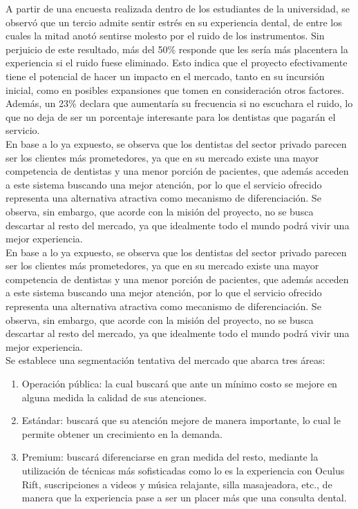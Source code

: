 \documentclass[letterpaper,12pt]{article}
\begin{document}
\indent A partir de una encuesta realizada dentro de los estudiantes de la universidad, se observó 
que un tercio admite sentir estrés en su experiencia dental, de entre los cuales la mitad anotó 
sentirse molesto por el ruido de los instrumentos. Sin perjuicio de este resultado, más del 50\% 
responde que les sería más placentera la experiencia si el ruido fuese eliminado. Esto indica que el 
proyecto efectivamente tiene el potencial de hacer un impacto en el mercado, tanto en su incursión 
inicial, como en posibles expansiones que tomen en consideración otros factores. Además, un 23\% 
declara que aumentaría su frecuencia si no escuchara el ruido, lo que no deja de ser un porcentaje 
interesante para los dentistas que pagarán el servicio.
\\[0.5cm]
\indent En base a lo ya expuesto, se observa que los dentistas del sector privado parecen ser los 
clientes más prometedores, ya que en su mercado existe una mayor competencia de dentistas y una 
menor porción de pacientes, que además acceden a este sistema buscando una mejor atención, por 
lo que el servicio ofrecido representa una alternativa atractiva como mecanismo de diferenciación. Se observa, sin embargo, que acorde con la misión del proyecto, no se busca descartar al resto del 
mercado, ya que idealmente todo el mundo podrá vivir una mejor experiencia.
\\[0.5cm]
\indent En base a lo ya expuesto, se observa que los dentistas del sector privado parecen ser los
clientes más prometedores, ya que en su mercado existe una mayor competencia de dentistas y una 
menor porción de pacientes, que además acceden a este sistema buscando una mejor atención, por 
lo que el servicio ofrecido representa una alternativa atractiva como mecanismo de diferenciación. Se observa, sin embargo, que acorde con la misión del proyecto, no se busca descartar al resto del 
mercado, ya que idealmente todo el mundo podrá vivir una mejor experiencia.
\\[0.5cm]
\indent Se establece una segmentación tentativa del mercado que abarca tres áreas:

	\begin{enumerate}
		\setlength{\itemsep}{0pt}%
		\setlength{\parskip}{0pt}%
		\item Operación pública: la cual buscará que ante un mínimo costo se mejore en alguna medida la calidad de sus atenciones.
		\item Estándar: buscará que su atención mejore de manera importante, lo cual le permite obtener un crecimiento en la demanda.
		\item Premium: buscará diferenciarse en gran medida del resto, mediante la utilización de técnicas más sofisticadas como lo es la experiencia con Oculus Rift, suscripciones a videos y música relajante, silla masajeadora, etc., de manera que la experiencia pase a ser un placer más que una consulta dental.
	\end{enumerate}
\end{document}
